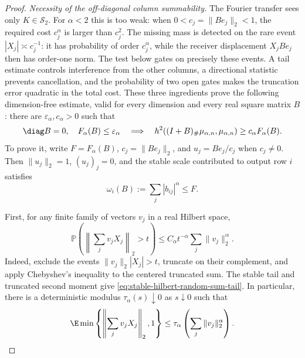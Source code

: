 \begin{proof}
\emph{Necessity of the off-diagonal column summability.}
The Fourier transfer sees only \(K\in\mathcal S_2\).  For \(\alpha<2\) this
is too weak: when \(0<c_j=\|Be_j\|_2<1\), the required cost
\(c_j^\alpha\) is larger than \(c_j^2\).  The missing mass is detected on the
rare event \(|X_j|\asymp c_j^{-1}\): it has probability of order
\(c_j^\alpha\), while the receiver displacement \(X_jBe_j\) then has
order-one norm.  The test below gates on precisely these events.  A tail
estimate controls interference from the other columns, a
directional statistic prevents cancellation, and the probability of two open
gates makes the truncation error quadratic in the total cost.  These three
ingredients prove the following dimension-free estimate, valid for every
dimension and every real square matrix \(B\): there are
\(\varepsilon_\alpha,c_\alpha>0\) such that
\begin{equation}
 \diag B=0,\quad F_\alpha(B)\le\varepsilon_\alpha
 \quad\Longrightarrow\quad
 h^2((I+B)_\#\mu_{\alpha,n},\mu_{\alpha,n})
 \ge c_\alpha F_\alpha(B).
 \label{eq:stable-off-diagonal-column-lower-bound}
\end{equation}
To prove it, write \(F=F_\alpha(B)\),
\(c_j=\|Be_j\|_2\), and
\(u_j=Be_j/c_j\) when \(c_j\ne0\).
Then \(\|u_j\|_2=1\), \((u_j)_j=0\), and the stable scale contributed to
output row \(i\) satisfies
\begin{equation}
 \omega_i(B):=\sum_j|b_{ij}|^\alpha\le F.
 \label{eq:stable-row-scale-bound}
\end{equation}

First, for any finite family of vectors \(v_j\) in a real Hilbert space,
\begin{equation}
 \mathbb P\left(\left\|\sum_jv_jX_j\right\|_2>t\right)
 \le C_\alpha t^{-\alpha}\sum_j\|v_j\|_2^\alpha.
 \label{eq:stable-hilbert-random-sum-tail}
\end{equation}
Indeed, exclude the events
\(\|v_j\|_2|X_j|>t\), truncate on their complement, and apply Chebyshev's
inequality to the centered truncated sum.
The stable tail and truncated second moment give
\eqref{eq:stable-hilbert-random-sum-tail}.
In particular, there is a deterministic modulus
\(\tau_\alpha(s)\downarrow0\) as \(s\downarrow0\) such that
\begin{equation}
 \E\min\left\{\left\|\sum_jv_jX_j\right\|_2,1\right\}
 \le\tau_\alpha\left(\sum_j\|v_j\|_2^\alpha\right).
 \label{eq:stable-hilbert-random-sum-truncation}
\end{equation}


\end{proof}

